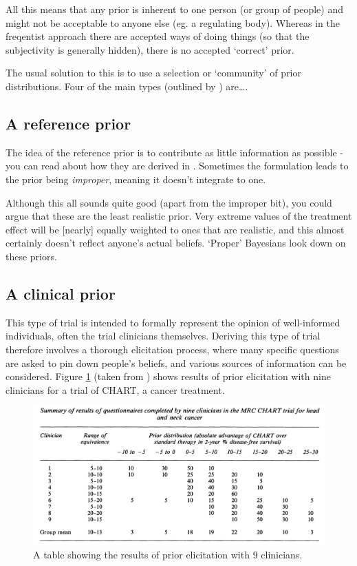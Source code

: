 \documentclass[
  openany]{book}
\theoremstyle{definition}
\theoremstyle{definition}
\theoremstyle{definition}
\theoremstyle{definition}
\theoremstyle{remark}
\begin{document}
All this means that any prior is inherent to one person (or group of people) and might not be acceptable to anyone else (eg. a regulating body). Whereas in the freqentist approach there are accepted ways of doing things (so that the subjectivity is generally hidden), there is no accepted `correct' prior.

The usual solution to this is to use a selection or `community' of prior distributions. Four of the main types (outlined by \citet{spiegelhalter1994bayesian}) are\ldots.

\subsection*{A reference prior}\label{a-reference-prior}

The idea of the reference prior is to contribute as little information as possible - you can read about how they are derived in \citet{berger2009formal}. Sometimes the formulation leads to the prior being \emph{improper}, meaning it doesn't integrate to one.

Although this all sounds quite good (apart from the improper bit), you could argue that these are the least realistic prior. Very extreme values of the treatment effect will be {[}nearly{]} equally weighted to ones that are realistic, and this almost certainly doesn't reflect anyone's actual beliefs. `Proper' Bayesians look down on these priors.

\subsection*{A clinical prior}\label{a-clinical-prior}

This type of trial is intended to formally represent the opinion of well-informed individuals, often the trial clinicians themselves. Deriving this type of trial therefore involves a thorough elicitation process, where many specific questions are asked to pin down people's beliefs, and various sources of information can be considered. Figure \ref{fig:spieg-elicit} (taken from \citet{spiegelhalter1994bayesian}) shows results of prior elicitation with nine clinicians for a trial of CHART, a cancer treatment.

\begin{figure}
\includegraphics[width=20.25in]{images/spieg_elicit} \caption{A table showing the results of prior elicitation with 9 clinicians.}\label{fig:spieg-elicit}
\end{figure}
\end{document}
